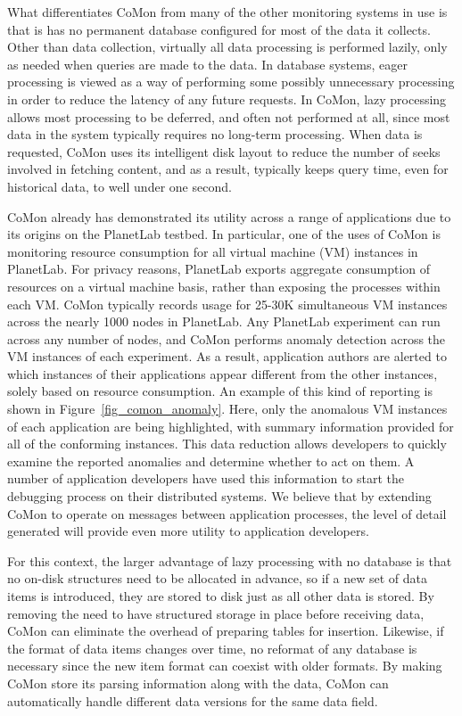 
What differentiates CoMon from many of the other monitoring systems in
use is that is has no permanent database configured for most of the
data it collects. Other than data collection, virtually all data
processing is performed lazily, only as needed when queries are made
to the data. In database systems, eager processing is viewed as a way
of performing some possibly unnecessary processing in order to reduce
the latency of any future requests. In CoMon, lazy processing allows
most processing to be deferred, and often not performed at all, since
most data in the system typically requires no long-term processing.
When data is requested, CoMon uses its intelligent disk layout to
reduce the number of seeks involved in fetching content, and as a
result, typically keeps query time, even for historical data, to well
under one second.

CoMon already has demonstrated its utility across a range of
applications due to its origins on the PlanetLab testbed. In
particular, one of the uses of CoMon is monitoring resource
consumption for all virtual machine (VM) instances in PlanetLab. For
privacy reasons, PlanetLab exports aggregate consumption of resources
on a virtual machine basis, rather than exposing the processes within
each VM. CoMon typically records usage for 25-30K simultaneous VM
instances across the nearly 1000 nodes in PlanetLab. Any PlanetLab
experiment can run across any number of nodes, and CoMon performs
anomaly detection across the VM instances of each experiment. As a
result, application authors are alerted to which instances of their
applications appear different from the other instances, solely based
on resource consumption. An example of this kind of reporting is shown
in Figure~\ref{fig_comon_anomaly}. Here, only the anomalous VM
instances of each application are being highlighted, with summary
information provided for all of the conforming instances. This data
reduction allows developers to quickly examine the reported anomalies
and determine whether to act on them. A number of application
developers have used this information to start the debugging process
on their distributed systems. We believe that by extending CoMon to
operate on messages between application processes, the level of detail
generated will provide even more utility to application developers.

For this context, the larger advantage of lazy processing with no
database is that no on-disk structures need to be allocated in
advance, so if a new set of data items is introduced, they are stored
to disk just as all other data is stored. By removing the need to have
structured storage in place before receiving data, CoMon can eliminate
the overhead of preparing tables for insertion. Likewise, if the
format of data items changes over time, no reformat of any database is
necessary since the new item format can coexist with older formats. By
making CoMon store its parsing information along with the data, CoMon
can automatically handle different data versions for the same data
field.

